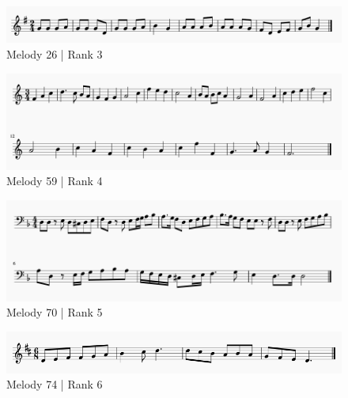 \documentclass[12pt,]{book}
\begin{document}
\begin{figure}

{\centering \includegraphics[width=1\linewidth]{img/survey_melodies/Berkowitz26} 

}

\caption{Melody 26 | Rank 3}\label{fig:berk26}
\end{figure}

\begin{figure}

{\centering \includegraphics[width=1\linewidth]{img/survey_melodies/Berkowitz59} 

}

\caption{Melody 59 | Rank 4}\label{fig:berk59}
\end{figure}

\begin{figure}

{\centering \includegraphics[width=1\linewidth]{img/survey_melodies/Berkowitz70} 

}

\caption{Melody 70 | Rank 5}\label{fig:berk70}
\end{figure}

\begin{figure}

{\centering \includegraphics[width=1\linewidth]{img/survey_melodies/Berkowitz74} 

}

\caption{Melody 74 | Rank 6}\label{fig:berk74}
\end{figure}
\end{document}
